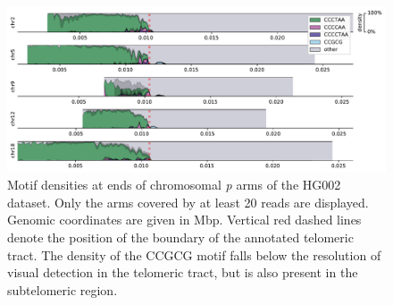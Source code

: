 \documentclass{article}
\begin{document}
\begin{figure}[ht!] \centering
\includegraphics[height=.9\textheight,width=\textwidth,keepaspectratio]{figures/HG002-densityplot-p_arm.pdf}
\caption{
    Motif densities at ends of chromosomal \textit{p} arms of the HG002 dataset.
    Only the arms covered by at least 20 reads are displayed.
    Genomic coordinates are given in Mbp.
    Vertical red dashed lines denote the position of the boundary of the annotated telomeric tract.
    The density of the CCGCG motif falls below the resolution of visual detection in the telomeric tract, but is also present in the subtelomeric region.
}
\label{fig:hg002_densityplot_p_arm}
\end{figure}
\clearpage \pagebreak
\end{document}

